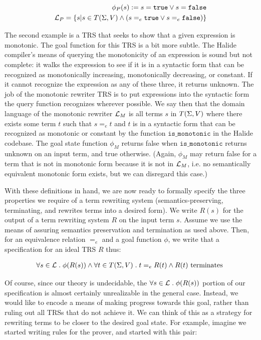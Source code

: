 \begin{align*}
    \phi_P(s) := s = \texttt{true} \vee s = \texttt{false} \\
    \mathcal{L}_P = \{s | s \in T(\Sigma,V) \wedge (s =_e \texttt{true} \vee s =_e \texttt{false})\} \\
\end{align*}

The second example is a TRS that seeks to show that a given expression is monotonic. The goal function for this TRS is a bit more subtle. The Halide compiler's means of querying the monotonicity of an expression is sound but not complete: it walks the expression to see if it is in a syntactic form that can be recognized as monotonically increasing, monotonically decreasing, or constant. If it cannot recognize the expression as any of these three, it returns unknown. The job of the monotonic rewriter TRS is to put expressions into the syntactic form the query function recognizes wherever possible. We say then that the domain language of the monotonic rewriter $\mathcal{L}_M$ is all terms $s$ in $T(\Sigma,V)$ where there exists some term $t$ such that $s =_e t$ and $t$ is in a syntactic form that can be recognized as monotonic or constant by the function $\texttt{is_monotonic}$ in the Halide codebase. The goal state function $\phi_M$ returns false when $\texttt{is_monotonic}$ returns unknown on an input term, and true otherwise. (Again, $\phi_M$ may return false for a term that is not in monotonic form because it is not in $\mathcal{L}_M$, i.e. no semantically equivalent monotonic form exists, but we can disregard this case.)

With these definitions in hand, we are now ready to formally specify the three properties we require of a term rewriting system (semantics-preserving, terminating, and rewrites terms into a desired form). We write $R(s)$ for the output of a term rewriting system $R$ on the input term $s$. Assume we use the means of assuring semantics preservation and termination as used above. Then, for an equivalence relation $=_e$ and a goal function $\phi$, we write that a specification for an ideal TRS $R$ thus:

\begin{align*}
\forall s \in \mathcal{L} \;.\; \phi(R(s)) \wedge \forall t \in T(\Sigma,V) \;.\; t =_e R(t) \wedge R(t) \textrm{ terminates }
\end{align*}

Of course, since our theory is undecidable, the $\forall s \in \mathcal{L} \;.\; \phi(R(s))$ portion of our specification is almost certainly unrealizable in the general case. Instead, we would like to encode a means of making progress towards this goal, rather than ruling out all TRSs that do not achieve it. We can think of this as a strategy for rewriting terms to be closer to the desired goal state. For example, imagine we started writing rules for the prover, and started with this pair:

